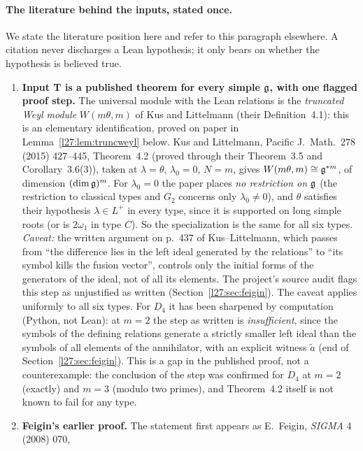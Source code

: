 \paragraph{The literature behind the inputs, stated once.} We state the literature position here and refer to this
paragraph elsewhere. A citation never discharges a Lean hypothesis; it only bears on whether the hypothesis is believed
true.
\begin{enumerate}
\item[(i)] \textbf{Input T is a published theorem for every simple $\mathfrak g$, with one flagged proof step.} The
  universal module with the Lean relations is the \emph{truncated Weyl module} $W(m\theta,m)$ of Kus and Littelmann (their
  Definition~4.1): this is an elementary identification, proved on paper in Lemma~\ref{l27:lem:truncweyl} below. Kus and
  Littelmann, Pacific J.\ Math.\ 278 (2015) 427--445, Theorem~4.2 (proved through their Theorem~3.5 and
  Corollary~3.6(3)), taken at $\lambda=\theta$, $\lambda_0=0$, $N=m$, gives $W(m\theta,m)\cong\mathfrak g^{*m}$, of dimension
  $(\dim\mathfrak g)^m$. For $\lambda_0=0$ the paper places \emph{no restriction on $\mathfrak g$} (the restriction to
  classical types and $G_2$ concerns only $\lambda_0\neq0$), and $\theta$ satisfies their hypothesis $\lambda\in L^+$ in every
  type, since it is supported on long simple roots (or is $2\omega_1$ in type $C$). So the specialization is the same for
  all six types. \emph{Caveat:} the written argument on p.~437 of Kus--Littelmann, which passes from ``the difference lies in
  the left ideal generated by the relations'' to ``its symbol kills the fusion vector'', controls only the initial forms of
  the generators of the ideal, not of all its elements. The project's source audit flags this step as unjustified as written
  (Section~\ref{l27:sec:feigin}). The caveat applies uniformly to all six types. For $D_4$ it has been sharpened by
  computation (Python, not Lean): at $m=2$ the step as written is \emph{insufficient}, since the symbols of the defining
  relations generate a strictly smaller left ideal than the symbols of all elements of the annihilator, with an explicit
  witness $\tilde a$ (end of Section~\ref{l27:sec:feigin}). This is a gap in the published proof, not a counterexample: the
  conclusion of the step was confirmed for $D_4$ at $m=2$ (exactly) and $m=3$ (modulo two primes), and Theorem~4.2 itself is not
  known to fail for any type.
\item[(ii)] \textbf{Feigin's earlier proof.} The statement first appears as E.~Feigin, \emph{SIGMA} 4 (2008) 070,

\end{enumerate}
